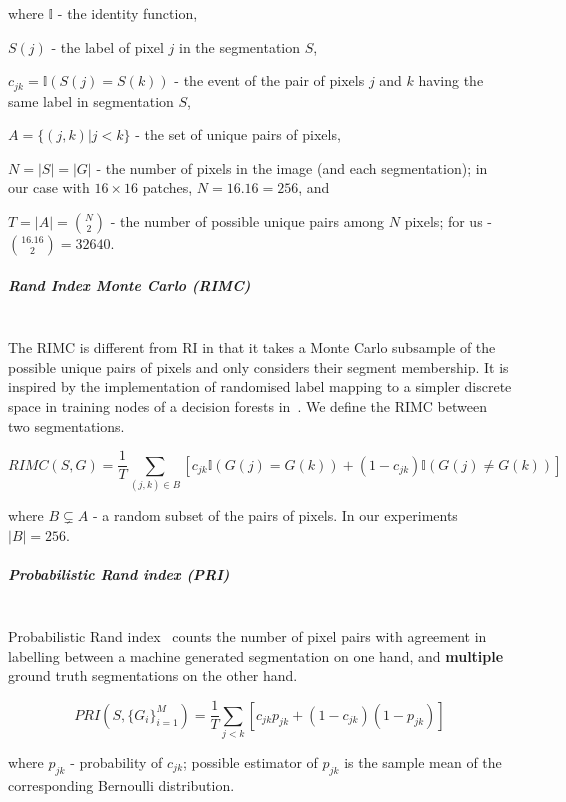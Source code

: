 where $\mathbb{I}$ - the identity function,

$S(j)$ - the label of pixel $j$ in the segmentation $S$,

$c_{jk}=\mathbb{I}\left(S(j)=S(k)\right)$ - the event of the pair
of pixels $j$ and $k$ having the same label in segmentation $S$,

$A=\{(j,k)|j<k\}$ - the set of unique pairs of pixels,

$N=\left|S\right|=\left|G\right|$ - the number of pixels in the image
(and each segmentation); in our case with $16\times 16$ patches, $N=16 . 16 = 256$, and 

$T=|A|=\binom{N}{2}$ - the number of possible unique pairs among
$N$ pixels; for us - $\binom{16 . 16}{2}=32 640$.


\subparagraph{Rand Index Monte Carlo (RIMC)}\mbox{}\\ %
\label{par:ch4-RIMC-maths}
The RIMC is different from RI in that it takes a Monte Carlo subsample of the possible unique pairs of pixels and only considers their segment membership. It is inspired by the implementation of randomised label mapping to a simpler discrete space in training nodes of a decision forests in~\cite{DollarICCV13edges}. We define the RIMC between two segmentations.

\[
RIMC(S,G)=\frac{1}{T}\sum\limits _{(j,k)\in B}\left[c_{jk}\mathbb{I}\left(G(j)=G(k)\right)+(1-c_{jk})\mathbb{I}\left(G(j)\neq G(k)\right)\right]
\]

where $B\subsetneq A$ - a random subset of the pairs of pixels.
In our experiments $|B|=256$.


\subparagraph{Probabilistic Rand index (PRI)}\mbox{}\\
\label{par:ch4-PRI-maths}
Probabilistic Rand index~\cite{UnnikrishnanPH07} counts the number of pixel pairs with agreement in %
labelling between a machine generated segmentation on one hand, and \textbf{multiple} ground truth segmentations on the other hand.


\[
PRI(S,\{G_{i}\}_{i=1}^{M})=\frac{1}{T}\sum\limits _{j<k}\left[c_{jk}p_{jk}+\left(1-c_{jk}\right)\left(1-p_{jk}\right)\right]
\]


where $p_{jk}$ - probability of $c_{jk}$; possible estimator of
$p_{jk}$ is the sample mean of the corresponding Bernoulli distribution.

